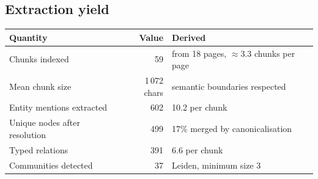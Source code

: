 \subsection{Extraction yield}

\begin{center}
\renewcommand{\arraystretch}{1.2}
\begin{tabular}{@{}l r l@{}}
\toprule
\textbf{Quantity} & \textbf{Value} & \textbf{Derived} \\
\midrule
Chunks indexed & 59 & from 18 pages, $\approx3.3$ chunks per page \\
Mean chunk size & 1\,072 chars & semantic boundaries respected \\
Entity mentions extracted & 602 & 10.2 per chunk \\
Unique nodes after resolution & 499 & 17\% merged by canonicalisation \\
Typed relations & 391 & 6.6 per chunk \\
Communities detected & 37 & Leiden, minimum size 3 \\
\bottomrule
\end{tabular}
\end{center}
